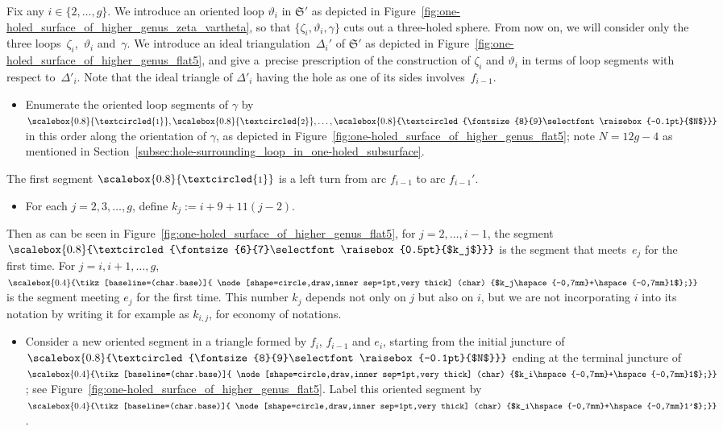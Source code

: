 \documentclass[10pt,a4paper]{amsart}
\numberwithin{equation}{section}
\theoremstyle{definition}
\newcommand{\circled}[1]{\scalebox{0.8}{\textcircled{\fontsize{8}{9}\selectfont \raisebox{-0.1pt}{#1}}}}
\newcommand{\circledd}[1]{\scalebox{0.8}{\textcircled{\fontsize{6}{7}\selectfont \raisebox{0.5pt}{#1}}}}
\newcommand*\circleddd[1]{\scalebox{0.4}{\tikz[baseline=(char.base)]{
 \node[shape=circle,draw,inner sep=1pt,very thick] (char) {#1};}}}
\begin{document}
Fix any $i\in \{2,\dots,g\}$. We introduce an oriented loop $\vartheta_i$ in $\mathfrak{S}'$ as depicted in Figure~\ref{fig:one-holed_surface_of_higher_genus_zeta_vartheta}, so that $\{\zeta_i,\vartheta_i,\gamma\}$ cuts out a three-holed sphere. From now on, we will consider only the three loops~$\zeta_i$,~$\vartheta_i$ and~$\gamma$. We introduce an ideal triangulation~$\Delta_i'$ of $\mathfrak{S}'$ as depicted in Figure~\ref{fig:one-holed_surface_of_higher_genus_flat5}, and give a~precise prescription of the construction of $\zeta_i$ and $\vartheta_i$ in terms of loop segments with respect to~$\Delta'_i$. Note that the ideal triangle of $\Delta'_i$ having the hole as one of its sides involves~$f_{i-1}$.
\begin{itemize}\itemsep=0pt
\item Enumerate the oriented loop segments of $\gamma$ by $\circled{1},\circled{2},\dots,\circled{$N$}$ in this order along the orientation of $\gamma$, as depicted in Figure~\ref{fig:one-holed_surface_of_higher_genus_flat5}; note $N = 12g-4$ as mentioned in Section~\ref{subsec:hole-surrounding_loop_in_one-holed_subsurface}.
\end{itemize}
The first segment $\circled{1}$ is a left turn from arc $f_{i-1}$ to arc $f_{i-1}'$.
\begin{itemize}\itemsep=0pt
\item For each $j=2,3,\dots,g$, define $k_j := i+9+11(j-2)$.
\end{itemize}
Then as can be seen in Figure~\ref{fig:one-holed_surface_of_higher_genus_flat5}, for $j=2,\dots,i-1$, the segment $\circledd{$k_j$}$ is the segment that meets~$e_j$ for the first time. For $j=i,i+1,\dots,g$, $\circleddd{$k_j\hspace{-0,7mm}+\hspace{-0,7mm}1$}$ is the segment meeting $e_j$ for the first time. This number $k_j$ depends not only on $j$ but also on $i$, but we are not incorporating $i$ into its notation by writing it for example as $k_{i,j}$, for economy of notations.
\begin{itemize}\itemsep=0pt
\item Consider a new oriented segment in a triangle formed by $f_i$, $f_{i-1}$ and $e_i$, starting from the initial juncture of $\circled{$N$}$ ending at the terminal juncture of $\circleddd{$k_i\hspace{-0,7mm}+\hspace{-0,7mm}1$}$; see Figure~\ref{fig:one-holed_surface_of_higher_genus_flat5}. Label this oriented segment by $\circleddd{$k_i\hspace{-0,7mm}+\hspace{-0,7mm}1'$}$.
\end{itemize}
\end{document}
